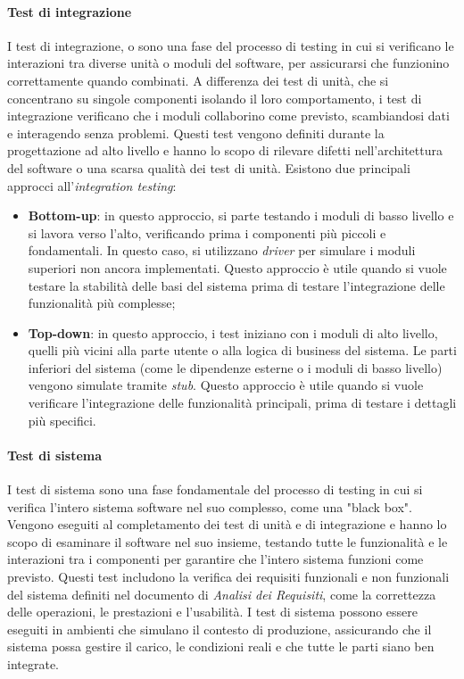 \paragraph{Test di integrazione}
I test di integrazione, o  sono una fase del processo di testing in cui si verificano le interazioni tra diverse unità o moduli del software, per assicurarsi che funzionino correttamente quando combinati. 
A differenza dei test di unità, che si concentrano su singole componenti isolando il loro comportamento, i test di integrazione verificano che i moduli collaborino come previsto, scambiandosi dati e interagendo senza problemi.
Questi test vengono definiti durante la progettazione ad alto livello e hanno lo scopo di rilevare difetti nell'architettura del software o una scarsa qualità dei test di unità.
Esistono due principali approcci all'\textit{integration testing}:
\begin{itemize}
    \item \textbf{Bottom-up}: in questo approccio, si parte testando i moduli di basso livello e si lavora verso l'alto, verificando prima i componenti più piccoli e fondamentali.
    In questo caso, si utilizzano \textit{driver} per simulare i moduli superiori non ancora implementati.
    Questo approccio è utile quando si vuole testare la stabilità delle basi del sistema prima di testare l'integrazione delle funzionalità più complesse;
    \item \textbf{Top-down}: in questo approccio, i test iniziano con i moduli di alto livello, quelli più vicini alla parte utente o alla logica di business del sistema.
    Le parti inferiori del sistema (come le dipendenze esterne o i moduli di basso livello) vengono simulate tramite \textit{stub}.
    Questo approccio è utile quando si vuole verificare l'integrazione delle funzionalità principali, prima di testare i dettagli più specifici.
\end{itemize}

\paragraph{Test di sistema}
I test di sistema sono una fase fondamentale del processo di testing in cui si verifica l'intero sistema software nel suo complesso, come una "black box".
Vengono eseguiti al completamento dei test di unità e di integrazione e hanno lo scopo di esaminare il software nel suo insieme, testando tutte le funzionalità e le interazioni tra i componenti per garantire che l'intero sistema funzioni come previsto.
Questi test includono la verifica dei requisiti funzionali e non funzionali del sistema definiti nel documento di \textit{Analisi dei Requisiti}, come la correttezza delle operazioni, le prestazioni e l'usabilità.
I test di sistema possono essere eseguiti in ambienti che simulano il contesto di produzione, assicurando che il sistema possa gestire il carico, le condizioni reali e che tutte le parti siano ben integrate.

